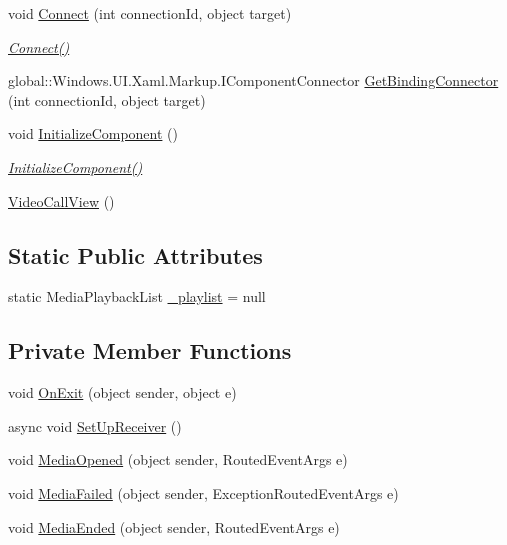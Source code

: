 \begin{DoxyCompactItemize}
void \hyperlink{class_e_l_i_client_1_1_video_call_view_1_1_video_call_view_a58984bc4c53e580e846c2d2afc500b01}{Connect} (int connection\+Id, object target)
\begin{DoxyCompactList}\small\item\em \hyperlink{class_e_l_i_client_1_1_video_call_view_1_1_video_call_view_a58984bc4c53e580e846c2d2afc500b01}{Connect()} \end{DoxyCompactList}\item 
global\+::\+Windows.\+U\+I.\+Xaml.\+Markup.\+I\+Component\+Connector \hyperlink{class_e_l_i_client_1_1_video_call_view_1_1_video_call_view_ae7097e1f8d74bc1af42c3023bda3cdb4}{Get\+Binding\+Connector} (int connection\+Id, object target)
\item 
void \hyperlink{class_e_l_i_client_1_1_video_call_view_1_1_video_call_view_a9c639cc5a9ea53e09963b60012149319}{Initialize\+Component} ()
\begin{DoxyCompactList}\small\item\em \hyperlink{class_e_l_i_client_1_1_video_call_view_1_1_video_call_view_a9c639cc5a9ea53e09963b60012149319}{Initialize\+Component()} \end{DoxyCompactList}\item 
\hyperlink{class_e_l_i_client_1_1_video_call_view_1_1_video_call_view_a995d034384b778ad0563c7b95a7fe0f5}{Video\+Call\+View} ()
\end{DoxyCompactItemize}
\subsection*{Static Public Attributes}
\begin{DoxyCompactItemize}
\item 
static Media\+Playback\+List \hyperlink{class_e_l_i_client_1_1_video_call_view_1_1_video_call_view_ac7804ca40c1b52e0a9987f7344b06109}{\+\_\+playlist} = null
\end{DoxyCompactItemize}
\subsection*{Private Member Functions}
\begin{DoxyCompactItemize}
\item 
void \hyperlink{class_e_l_i_client_1_1_video_call_view_1_1_video_call_view_a7306aa6f777886bf08c0134b435f7064}{On\+Exit} (object sender, object e)
\item 
async void \hyperlink{class_e_l_i_client_1_1_video_call_view_1_1_video_call_view_a9aa4d793f9c9240b8660ff70c44a9d6a}{Set\+Up\+Receiver} ()
\item 
void \hyperlink{class_e_l_i_client_1_1_video_call_view_1_1_video_call_view_af17a2fdb41001505d236e03d8969267a}{Media\+Opened} (object sender, Routed\+Event\+Args e)
\item 
void \hyperlink{class_e_l_i_client_1_1_video_call_view_1_1_video_call_view_a96f9be69dc0da070a75249809a157aed}{Media\+Failed} (object sender, Exception\+Routed\+Event\+Args e)
\item 
void \hyperlink{class_e_l_i_client_1_1_video_call_view_1_1_video_call_view_ac92c698a77d1861e43cbdf1d8da29146}{Media\+Ended} (object sender, Routed\+Event\+Args e)
\end{DoxyCompactItemize}
